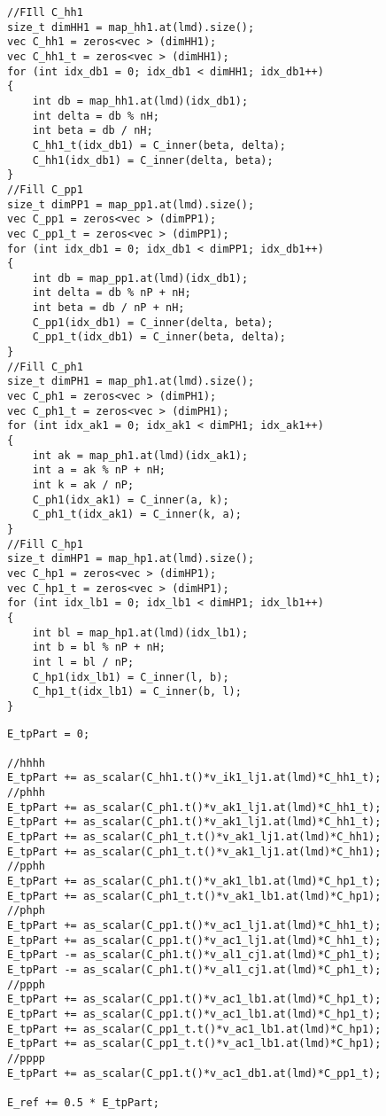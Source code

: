 \begin{lstlisting}[float,label={lst:CC:hfE_C},caption={Filling the coefficients from eq~\eqref{eq:CC:mapHFcoeff}. $C^N$ is stored in `C\_xx1' whereas $C^P$ is stored in `C\_xx1\_t'.}]
//FIll C_hh1
size_t dimHH1 = map_hh1.at(lmd).size();
vec C_hh1 = zeros<vec > (dimHH1);
vec C_hh1_t = zeros<vec > (dimHH1);
for (int idx_db1 = 0; idx_db1 < dimHH1; idx_db1++)
{
    int db = map_hh1.at(lmd)(idx_db1);
    int delta = db % nH;
    int beta = db / nH;
    C_hh1_t(idx_db1) = C_inner(beta, delta);
	C_hh1(idx_db1) = C_inner(delta, beta);
}
//Fill C_pp1
size_t dimPP1 = map_pp1.at(lmd).size();
vec C_pp1 = zeros<vec > (dimPP1);
vec C_pp1_t = zeros<vec > (dimPP1);
for (int idx_db1 = 0; idx_db1 < dimPP1; idx_db1++)
{
    int db = map_pp1.at(lmd)(idx_db1);
    int delta = db % nP + nH;
    int beta = db / nP + nH;
    C_pp1(idx_db1) = C_inner(delta, beta);
	C_pp1_t(idx_db1) = C_inner(beta, delta);
}
//Fill C_ph1
size_t dimPH1 = map_ph1.at(lmd).size();
vec C_ph1 = zeros<vec > (dimPH1);
vec C_ph1_t = zeros<vec > (dimPH1);
for (int idx_ak1 = 0; idx_ak1 < dimPH1; idx_ak1++)
{
    int ak = map_ph1.at(lmd)(idx_ak1);
    int a = ak % nP + nH;
    int k = ak / nP;
    C_ph1(idx_ak1) = C_inner(a, k);
	C_ph1_t(idx_ak1) = C_inner(k, a);
}
//Fill C_hp1
size_t dimHP1 = map_hp1.at(lmd).size();
vec C_hp1 = zeros<vec > (dimHP1);
vec C_hp1_t = zeros<vec > (dimHP1);
for (int idx_lb1 = 0; idx_lb1 < dimHP1; idx_lb1++)
{
    int bl = map_hp1.at(lmd)(idx_lb1);
    int b = bl % nP + nH;
    int l = bl / nP;
    C_hp1(idx_lb1) = C_inner(l, b);
	C_hp1_t(idx_lb1) = C_inner(b, l);
}
\end{lstlisting}


\begin{lstlisting}[float,label={lst:CC:hf_E_tp},caption={Two-particle part of HF energy.}]
E_tpPart = 0;

//hhhh
E_tpPart += as_scalar(C_hh1.t()*v_ik1_lj1.at(lmd)*C_hh1_t);
//phhh
E_tpPart += as_scalar(C_ph1.t()*v_ak1_lj1.at(lmd)*C_hh1_t);
E_tpPart += as_scalar(C_ph1.t()*v_ak1_lj1.at(lmd)*C_hh1_t);
E_tpPart += as_scalar(C_ph1_t.t()*v_ak1_lj1.at(lmd)*C_hh1);
E_tpPart += as_scalar(C_ph1_t.t()*v_ak1_lj1.at(lmd)*C_hh1);
//pphh
E_tpPart += as_scalar(C_ph1.t()*v_ak1_lb1.at(lmd)*C_hp1_t);
E_tpPart += as_scalar(C_ph1_t.t()*v_ak1_lb1.at(lmd)*C_hp1);
//phph
E_tpPart += as_scalar(C_pp1.t()*v_ac1_lj1.at(lmd)*C_hh1_t);
E_tpPart += as_scalar(C_pp1.t()*v_ac1_lj1.at(lmd)*C_hh1_t);
E_tpPart -= as_scalar(C_ph1.t()*v_al1_cj1.at(lmd)*C_ph1_t);
E_tpPart -= as_scalar(C_ph1.t()*v_al1_cj1.at(lmd)*C_ph1_t);
//ppph
E_tpPart += as_scalar(C_pp1.t()*v_ac1_lb1.at(lmd)*C_hp1_t);
E_tpPart += as_scalar(C_pp1.t()*v_ac1_lb1.at(lmd)*C_hp1_t);
E_tpPart += as_scalar(C_pp1_t.t()*v_ac1_lb1.at(lmd)*C_hp1);
E_tpPart += as_scalar(C_pp1_t.t()*v_ac1_lb1.at(lmd)*C_hp1);
//pppp
E_tpPart += as_scalar(C_pp1.t()*v_ac1_db1.at(lmd)*C_pp1_t);

E_ref += 0.5 * E_tpPart;
\end{lstlisting}









